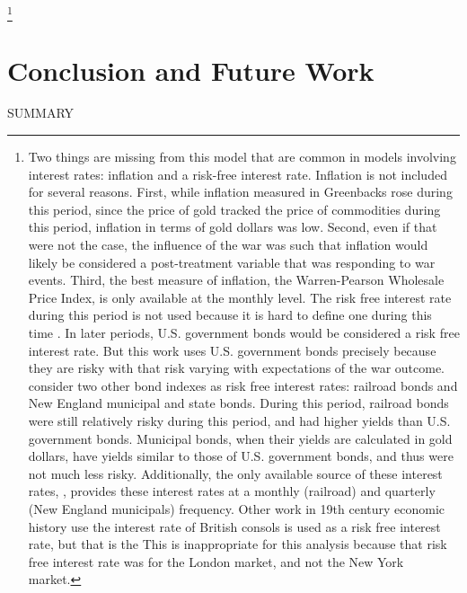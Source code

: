 \footnote{
  Two things are missing from this model that are common in models involving interest rates: inflation and a risk-free interest rate.
  Inflation is not included for several reasons.
  First, while inflation measured in Greenbacks rose during this period, since the price of gold tracked the price of commodities during this period, inflation in terms of gold dollars was low\parencites{Mitchell1903}{Mitchell1908}.
  Second, even if that were not the case, the influence of the war was such that inflation would likely be considered a post-treatment variable that was responding to war events.
  Third, the best measure of inflation, the Warren-Pearson Wholesale Price Index, is only available at the monthly level.
  The risk free interest rate during this period is not used because it is hard to define one during this time \parencites{HomerSylla2005}.
  In later periods, U.S. government bonds would be considered a risk free interest rate.
  But this work uses U.S. government bonds precisely because they are risky with that risk varying with expectations of the war outcome.
  \textcites{Macaulay1938}{HomerSylla2005} consider two other bond indexes as risk free interest rates: railroad bonds and New England municipal and state bonds.
  During this period, railroad bonds were still relatively risky during this period, and had higher yields than U.S. government bonds.
  Municipal bonds, when their yields are calculated in gold dollars, have yields similar to those of U.S. government bonds, and thus were not much less risky.
  Additionally, the only available source of these interest rates, \textcite{Macaulay1938}, provides these interest rates at a monthly (railroad) and quarterly (New England municipals) frequency.
  Other work in 19th century economic history use the interest rate of British consols is used as a risk free interest rate, but that is the 
  This is inappropriate for this analysis because that risk free interest rate was for the London market, and not the New York market.

}

\section{Conclusion and Future Work}
\label{bonds_battles:sec:conclusion}

SUMMARY 


